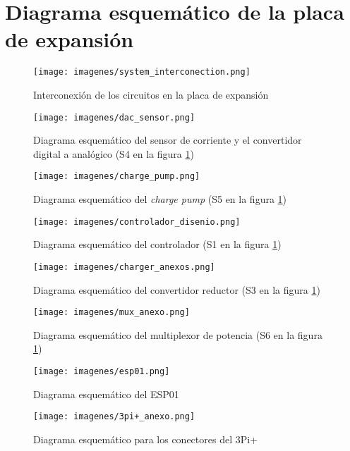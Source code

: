 \section{Diagrama esquemático de la placa de expansión}


\begin{figure}[H]
    \centering
    \texttt{[image: imagenes/system\_interconection.png]}
    \caption{Interconexión de los circuitos en la placa de expansión}
    \label{fig:all}    
\end{figure}

\begin{figure}[H]
    \centering
    \texttt{[image: imagenes/dac\_sensor.png]}
    \caption{Diagrama esquemático del sensor de corriente y el convertidor digital a analógico
    (S4 en la figura \ref{fig:all})}
    \label{fig:dac_sensor}
\end{figure}


\begin{figure}[H]
    \centering
    \texttt{[image: imagenes/charge\_pump.png]}
    \caption{Diagrama esquemático del \textit{charge pump} (S5 en la figura \ref{fig:all})}
    \label{fig:charge_pump_anexo}
\end{figure}


\begin{figure}[H]
    \centering
    \texttt{[image: imagenes/controlador\_disenio.png]}
    \caption{Diagrama esquemático del controlador (S1 en la figura \ref{fig:all})}
    \label{fig:controlador_anexo}
\end{figure}

\begin{figure}[H]
    \centering
    \texttt{[image: imagenes/charger\_anexos.png]}
    \caption{Diagrama esquemático del convertidor reductor (S3 en la figura \ref{fig:all})}
    \label{fig:charger_anexo}
\end{figure}

\begin{figure}[H]
    \centering
    \texttt{[image: imagenes/mux\_anexo.png]}
    \caption{Diagrama esquemático del multiplexor de potencia (S6 en la figura \ref{fig:all})}
    \label{fig:charger_anexo}  
\end{figure}

\begin{figure}[H]
    \centering
    \texttt{[image: imagenes/esp01.png]}
    \caption{Diagrama esquemático del ESP01}
    \label{fig:esp01_anexo}
\end{figure}

\begin{figure}[H]
    \centering
    \texttt{[image: imagenes/3pi+\_anexo.png]}
    \caption{Diagrama esquemático para los conectores del 3Pi+}
    \label{fig:3pi+_anexo}
\end{figure}